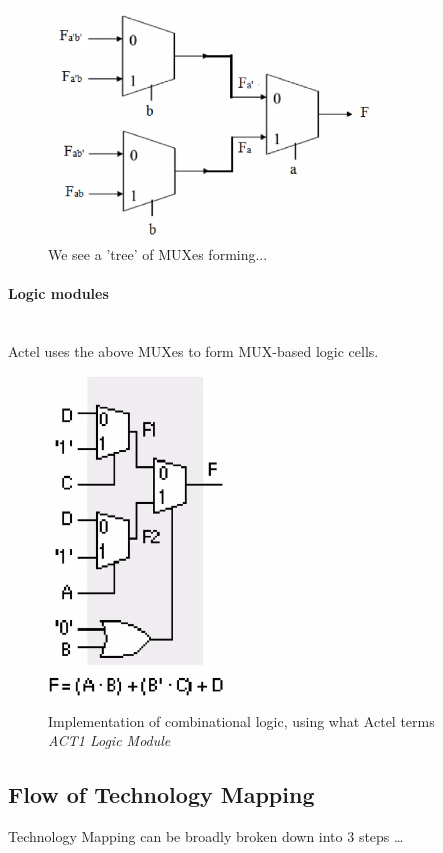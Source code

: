 \documentclass{article}
\begin{document}
\begin{figure}[htp]
    \centering
    \includegraphics[width=9cm, scale=1]{S2/SDT_2.PNG}
    \caption{We see a 'tree' of MUXes forming...}
\end{figure}

\paragraph{Logic modules}\mbox{}\\
Actel uses the above MUXes to form MUX-based logic cells.

\begin{figure}[htp]
    \centering
    \includegraphics[width=5cm, scale=1]{S2/actel.PNG}
    \caption{Implementation of combinational logic, using what Actel terms \textit{ACT1 Logic Module}}
\end{figure}

\newpage
\subsection{Flow of Technology Mapping}
Technology Mapping can be broadly broken down into 3 steps \dots
\end{document}
